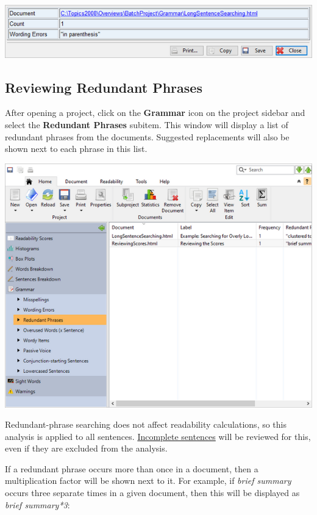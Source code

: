 \documentclass[
]{book}
\theoremstyle{definition}
\theoremstyle{definition}
\theoremstyle{definition}
\theoremstyle{definition}
\theoremstyle{remark}
\begin{document}
\begin{center}\includegraphics[width=0.75\linewidth,]{Images/batchwordingerrorsviewitem} \end{center}

\hypertarget{reviewing-batch-redundant-phrases}{%
\subsection*{Reviewing Redundant Phrases}\label{reviewing-batch-redundant-phrases}}

After opening a project, click on the \textbf{Grammar} icon on the project sidebar and select the \textbf{Redundant Phrases} subitem. This window will display a list of redundant phrases from the documents. Suggested replacements will also be shown next to each phrase in this list.

\includegraphics{Images/batchredundantphrases.png}

Redundant-phrase searching does not affect readability calculations, so this analysis is applied to all sentences. \protect\hyperlink{how-text-is-excluded}{Incomplete sentences} will be reviewed for this, even if they are excluded from the analysis.

If a redundant phrase occurs more than once in a document, then a multiplication factor will be shown next to it. For example, if \emph{brief summary} occurs three separate times in a given document, then this will be displayed as \emph{brief summary*3}:
\end{document}
